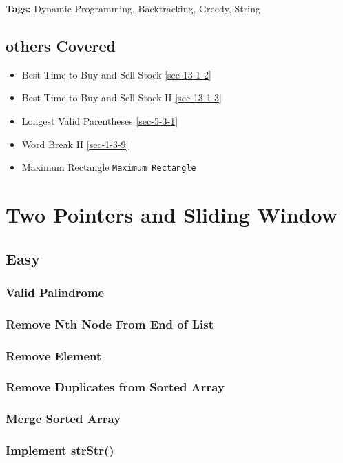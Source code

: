 \documentclass[12pt]{book}
\begin{document}
\textbf{Tags:} Dynamic Programming, Backtracking, Greedy, String

\section{others Covered}
\label{sec-14-4}
\begin{itemize}
\item Best Time to Buy and Sell Stock
\ref{sec-13-1-2}
\item Best Time to Buy and Sell Stock II
\ref{sec-13-1-3}
\item Longest Valid Parentheses
\ref{sec-5-3-1}
\item Word Break II
\ref{sec-1-3-9}
\item Maximum Rectangle
\texttt{Maximum Rectangle}
\end{itemize}

\chapter{Two Pointers and Sliding Window}
\label{sec-15}
\section{Easy}
\label{sec-15-1}
\subsection{Valid Palindrome}
\label{sec-15-1-1}
\subsection{Remove Nth Node From End of List}
\label{sec-15-1-2}
\subsection{Remove Element}
\label{sec-15-1-3}
\subsection{Remove Duplicates from Sorted Array}
\label{sec-15-1-4}
\subsection{Merge Sorted Array}
\label{sec-15-1-5}
\subsection{Implement strStr()}
\label{sec-15-1-6}
\end{document}
